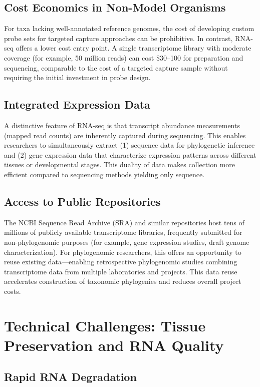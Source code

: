 \subsection{Cost Economics in Non-Model Organisms}

For taxa lacking well-annotated reference genomes, the cost of developing custom probe sets for targeted capture approaches can be prohibitive. In contrast, RNA-seq offers a lower cost entry point. A single transcriptome library with moderate coverage (for example, 50 million reads) can cost \$30--100 for preparation and sequencing, comparable to the cost of a targeted capture sample without requiring the initial investment in probe design.

\subsection{Integrated Expression Data}

A distinctive feature of RNA-seq is that transcript abundance measurements (mapped read counts) are inherently captured during sequencing. This enables researchers to simultaneously extract (1) sequence data for phylogenetic inference and (2) gene expression data that characterize expression patterns across different tissues or developmental stages. This duality of data makes collection more efficient compared to sequencing methods yielding only sequence.

\subsection{Access to Public Repositories}

The NCBI Sequence Read Archive (SRA) and similar repositories host tens of millions of publicly available transcriptome libraries, frequently submitted for non-phylogenomic purposes (for example, gene expression studies, draft genome characterization). For phylogenomic researchers, this offers an opportunity to reuse existing data---enabling retrospective phylogenomic studies combining transcriptome data from multiple laboratories and projects. This data reuse accelerates construction of taxonomic phylogenies and reduces overall project costs.

\section{Technical Challenges: Tissue Preservation and RNA Quality}

\subsection{Rapid RNA Degradation}

